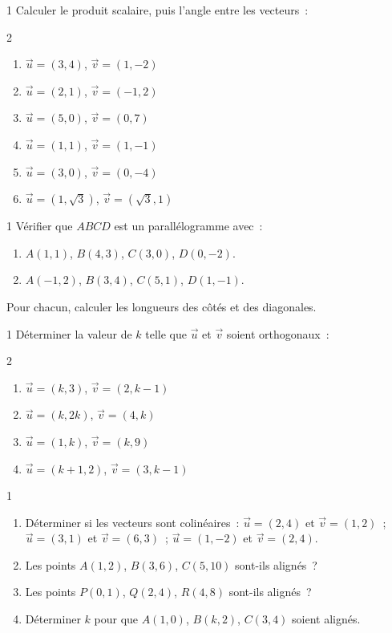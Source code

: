 \begin{exo}{1}
Calculer le produit scalaire, puis l'angle entre les vecteurs~:
\begin{multicols}{2}
\begin{enumerate}
  \item $\vec{u}=(3,4)$, $\vec{v}=(1,-2)$
  \item $\vec{u}=(2,1)$, $\vec{v}=(-1,2)$
  \item $\vec{u}=(5,0)$, $\vec{v}=(0,7)$
  \item $\vec{u}=(1,1)$, $\vec{v}=(1,-1)$
  \item $\vec{u}=(3,0)$, $\vec{v}=(0,-4)$
  \item $\vec{u}=(1,\sqrt{3})$, $\vec{v}=(\sqrt{3},1)$
\end{enumerate}
\end{multicols}
\end{exo}

\begin{exo}{1}
V\'erifier que $ABCD$ est un parall\'elogramme avec~:
\begin{enumerate}
  \item $A(1,1)$, $B(4,3)$, $C(3,0)$, $D(0,-2)$.
  \item $A(-1,2)$, $B(3,4)$, $C(5,1)$, $D(1,-1)$.
\end{enumerate}
Pour chacun, calculer les longueurs des c\^ot\'es et des diagonales.
\end{exo}

\begin{exo}{1}
D\'eterminer la valeur de $k$ telle que $\vec{u}$ et $\vec{v}$ soient orthogonaux~:
\begin{multicols}{2}
\begin{enumerate}
  \item $\vec{u}=(k,3)$, $\vec{v}=(2,k-1)$
  \item $\vec{u}=(k,2k)$, $\vec{v}=(4,k)$
  \item $\vec{u}=(1,k)$, $\vec{v}=(k,9)$
  \item $\vec{u}=(k+1,2)$, $\vec{v}=(3,k-1)$
\end{enumerate}
\end{multicols}
\end{exo}

\begin{exo}{1}
\begin{enumerate}
  \item D\'eterminer si les vecteurs sont colin\'eaires~:
        $\vec{u}=(2,4)$ et $\vec{v}=(1,2)$~;
        $\vec{u}=(3,1)$ et $\vec{v}=(6,3)$~;
        $\vec{u}=(1,-2)$ et $\vec{v}=(2,4)$.
  \item Les points $A(1,2)$, $B(3,6)$, $C(5,10)$ sont-ils align\'es~?
  \item Les points $P(0,1)$, $Q(2,4)$, $R(4,8)$ sont-ils align\'es~?
  \item D\'eterminer $k$ pour que $A(1,0)$, $B(k,2)$, $C(3,4)$ soient align\'es.
\end{enumerate}
\end{exo}

